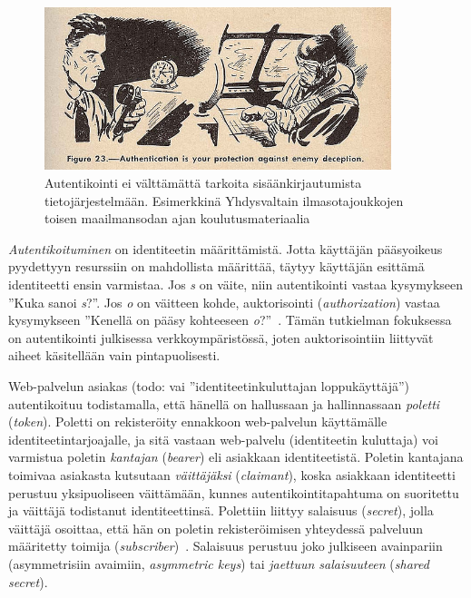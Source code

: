 \documentclass[finnish,gradu]{tktltiki}
\begin{document}
  \begin{figure}[h!]
    \centering
    \includegraphics[width=0.9\textwidth]{images/usnavy_authentication.jpg}
    \caption{Autentikointi ei välttämättä tarkoita sisäänkirjautumista tietojärjestelmään. Esimerkkinä Yhdysvaltain ilmasotajoukkojen toisen maailmansodan ajan koulutusmateriaalia~\cite{usnavy_authentication}}
    \label{fig:autentikointi_suojaa_viholliselta}
  \end{figure}


  \emph{Autentikoituminen} on identiteetin määrittämistä. Jotta käyttäjän pääsyoikeus pyydettyyn resurssiin on mahdollista määrittää, täytyy käyttäjän esittämä identiteetti ensin varmistaa. Jos \emph{s} on väite, niin autentikointi vastaa kysymykseen ''Kuka sanoi \emph{s}?''. Jos \emph{o} on väitteen kohde, auktorisointi (\emph{authorization}) vastaa kysymykseen ''Kenellä on pääsy kohteeseen \emph{o}?''~\cite{lampson_distributed_1992}. Tämän tutkielman fokuksessa on autentikointi julkisessa verkkoympäristössä, joten auktorisointiin liittyvät aiheet käsitellään vain pintapuolisesti.


  Web-palvelun asiakas (todo: vai ''identiteetinkuluttajan loppukäyttäjä'') autentikoituu todistamalla, että hänellä on hallussaan ja hallinnassaan \emph{poletti} (\emph{token}). Poletti on rekisteröity ennakkoon web-palvelun käyttämälle identiteetintarjoajalle, ja sitä vastaan web-palvelu (identiteetin kuluttaja) voi varmistua poletin \emph{kantajan} (\emph{bearer}) eli asiakkaan identiteetistä. Poletin kantajana toimivaa asiakasta kutsutaan \emph{väittäjäksi} (\emph{claimant}), koska asiakkaan identiteetti perustuu yksipuoliseen väittämään, kunnes autentikointitapahtuma on suoritettu ja väittäjä todistanut identiteettinsä. Polettiin liittyy salaisuus (\emph{secret}), jolla väittäjä osoittaa, että hän on poletin rekisteröimisen yhteydessä palveluun määritetty toimija (\emph{subscriber})~\cite{NIST_SP800-63-1}. Salaisuus perustuu joko julkiseen avainpariin (asymmetrisiin avaimiin, \emph{asymmetric keys}) tai \emph{jaettuun salaisuuteen} (\emph{shared secret}).
\end{document}
